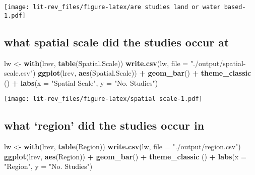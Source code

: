 \documentclass[
]{article}
\newenvironment{Shaded}{\begin{snugshade}}{\end{snugshade}}
\newcommand{\DataTypeTok}[1]{\textcolor[rgb]{0.13,0.29,0.53}{#1}}
\newcommand{\KeywordTok}[1]{\textcolor[rgb]{0.13,0.29,0.53}{\textbf{#1}}}
\newcommand{\NormalTok}[1]{#1}
\newcommand{\OperatorTok}[1]{\textcolor[rgb]{0.81,0.36,0.00}{\textbf{#1}}}
\newcommand{\StringTok}[1]{\textcolor[rgb]{0.31,0.60,0.02}{#1}}
\begin{document}
\texttt{[image: lit-rev\_files/figure-latex/are studies land or water based-1.pdf]}

\hypertarget{what-spatial-scale-did-the-studies-occur-at}{%
\subsection{what spatial scale did the studies occur
at}\label{what-spatial-scale-did-the-studies-occur-at}}

\begin{Shaded}
\begin{Highlighting}[]
\NormalTok{lw <-}\StringTok{ }\KeywordTok{with}\NormalTok{(lrev, }\KeywordTok{table}\NormalTok{(Spatial.Scale))}
\KeywordTok{write.csv}\NormalTok{(lw, }\DataTypeTok{file =} \StringTok{"./output/spatial-scale.csv"}\NormalTok{)}
\KeywordTok{ggplot}\NormalTok{(lrev, }\KeywordTok{aes}\NormalTok{(Spatial.Scale)) }\OperatorTok{+}\StringTok{ }\KeywordTok{geom_bar}\NormalTok{() }\OperatorTok{+}\StringTok{ }\KeywordTok{theme_classic}\NormalTok{ () }\OperatorTok{+}\StringTok{ }\KeywordTok{labs}\NormalTok{(}\DataTypeTok{x =} \StringTok{"Spatial Scale"}\NormalTok{, }\DataTypeTok{y =} \StringTok{"No. Studies"}\NormalTok{)}
\end{Highlighting}
\end{Shaded}

\texttt{[image: lit-rev\_files/figure-latex/spatial scale-1.pdf]}

\hypertarget{what-region-did-the-studies-occur-in}{%
\subsection{what `region' did the studies occur
in}\label{what-region-did-the-studies-occur-in}}

\begin{Shaded}
\begin{Highlighting}[]
\NormalTok{lw <-}\StringTok{ }\KeywordTok{with}\NormalTok{(lrev, }\KeywordTok{table}\NormalTok{(Region))}
\KeywordTok{write.csv}\NormalTok{(lw, }\DataTypeTok{file =} \StringTok{"./output/region.csv"}\NormalTok{)}
\KeywordTok{ggplot}\NormalTok{(lrev, }\KeywordTok{aes}\NormalTok{(Region)) }\OperatorTok{+}\StringTok{ }\KeywordTok{geom_bar}\NormalTok{() }\OperatorTok{+}\StringTok{ }\KeywordTok{theme_classic}\NormalTok{ () }\OperatorTok{+}\StringTok{ }\KeywordTok{labs}\NormalTok{(}\DataTypeTok{x =} \StringTok{"Region"}\NormalTok{, }\DataTypeTok{y =} \StringTok{"No. Studies"}\NormalTok{)}
\end{Highlighting}
\end{Shaded}
\end{document}

